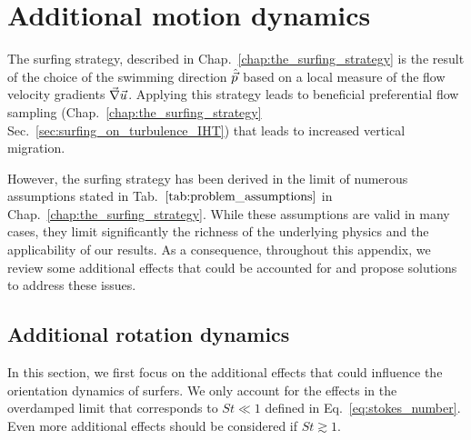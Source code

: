 \chapter{Additional motion dynamics}\label{app:additional_motion}

The surfing strategy, described in Chap.~\ref{chap:the_surfing_strategy} is the result of the choice of the swimming direction $\hat{\vec{p}}$ based on a local measure of the flow velocity gradients $\vec{\nabla} \vec{u}$.
Applying this strategy leads to beneficial preferential flow sampling (Chap.~\ref{chap:the_surfing_strategy} Sec.~\ref{sec:surfing_on_turbulence_IHT}) that leads to increased vertical migration.

However, the surfing strategy has been derived in the limit of numerous assumptions stated in Tab.~$\ref{tab:problem_assumptions}$ in Chap.~\ref{chap:the_surfing_strategy}.
While these assumptions are valid in many cases, they limit significantly the richness of the underlying physics and the applicability of our results.
As a consequence, throughout this appendix, we review some additional effects that could be accounted for and propose solutions to address these issues.


\section{Additional rotation dynamics}\label{sec:additional_rotation}

In this section, we first focus on the additional effects that could influence the orientation dynamics of surfers.
We only account for the effects in the overdamped limit that corresponds to $\mathit{St} \ll 1$ defined in Eq.~\eqref{eq:stokes_number}.
Even more additional effects should be considered if $\mathit{St} \gtrsim 1$.

